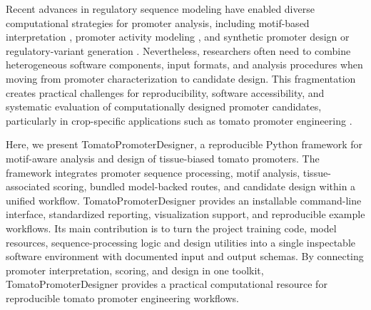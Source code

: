 \documentclass[numsec,webpdf,modern,large]{oup-authoring-template}
\begin{document}
Recent advances in regulatory sequence modeling have enabled diverse computational strategies for promoter analysis, including motif-based interpretation \citep{Lescot2002,Sandelin2004,Fornes2020}, promoter activity modeling \citep{Avsec2021,Washburn2019,Zhang2023}, and synthetic promoter design or regulatory-variant generation \citep{Kotopka2020,Yang2021,Jin2024}. Nevertheless, researchers often need to combine heterogeneous software components, input formats, and analysis procedures when moving from promoter characterization to candidate design. This fragmentation creates practical challenges for reproducibility, software accessibility, and systematic evaluation of computationally designed promoter candidates, particularly in crop-specific applications such as tomato promoter engineering \citep{Sato2012}.

Here, we present TomatoPromoterDesigner, a reproducible Python framework for motif-aware analysis and design of tissue-biased tomato promoters. The framework integrates promoter sequence processing, motif analysis, tissue-associated scoring, bundled model-backed routes, and candidate design within a unified workflow. TomatoPromoterDesigner provides an installable command-line interface, standardized reporting, visualization support, and reproducible example workflows. Its main contribution is to turn the project training code, model resources, sequence-processing logic and design utilities into a single inspectable software environment with documented input and output schemas. By connecting promoter interpretation, scoring, and design in one toolkit, TomatoPromoterDesigner provides a practical computational resource for reproducible tomato promoter engineering workflows.
\end{document}
